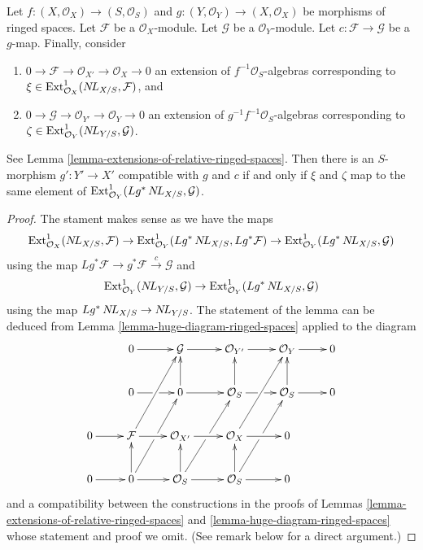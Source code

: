 \begin{lemma}
\label{lemma-extensions-of-relative-ringed-spaces-functorial}
Let $f : (X, \mathcal{O}_X) \to (S, \mathcal{O}_S)$ and
$g : (Y, \mathcal{O}_Y) \to (X, \mathcal{O}_X)$ be morphisms
of ringed spaces. Let $\mathcal{F}$ be a $\mathcal{O}_X$-module.
Let $\mathcal{G}$ be a $\mathcal{O}_Y$-module. Let
$c : \mathcal{F} \to \mathcal{G}$ be a $g$-map. Finally, consider
\begin{enumerate}
\item[(a)] $0 \to \mathcal{F} \to \mathcal{O}_{X'} \to \mathcal{O}_X \to 0$
an extension of $f^{-1}\mathcal{O}_S$-algebras
corresponding to $\xi \in \mathop{\mathrm{Ext}}\nolimits^1_{\mathcal{O}_X}(\mathop{N\!L}\nolimits_{X/S}, \mathcal{F})$, and
\item[(b)] $0 \to \mathcal{G} \to \mathcal{O}_{Y'} \to \mathcal{O}_Y \to 0$
an extension of $g^{-1}f^{-1}\mathcal{O}_S$-algebras
corresponding to $\zeta \in \mathop{\mathrm{Ext}}\nolimits^1_{\mathcal{O}_Y}(\mathop{N\!L}\nolimits_{Y/S}, \mathcal{G})$.
\end{enumerate}
See Lemma \ref{lemma-extensions-of-relative-ringed-spaces}.
Then there is an $S$-morphism $g' : Y' \to X'$
compatible with $g$ and $c$ if and only if $\xi$ and $\zeta$
map to the same element of
$\mathop{\mathrm{Ext}}\nolimits^1_{\mathcal{O}_Y}(Lg^*\mathop{N\!L}\nolimits_{X/S}, \mathcal{G})$.
\end{lemma}

\begin{proof}
The stament makes sense as we have the maps
$$
\mathop{\mathrm{Ext}}\nolimits^1_{\mathcal{O}_X}(\mathop{N\!L}\nolimits_{X/S}, \mathcal{F}) \to
\mathop{\mathrm{Ext}}\nolimits^1_{\mathcal{O}_Y}(Lg^*\mathop{N\!L}\nolimits_{X/S}, Lg^*\mathcal{F}) \to
\mathop{\mathrm{Ext}}\nolimits^1_{\mathcal{O}_Y}(Lg^*\mathop{N\!L}\nolimits_{X/S}, \mathcal{G})
$$
using the map $Lg^*\mathcal{F} \to g^*\mathcal{F} \xrightarrow{c} \mathcal{G}$
and
$$
\mathop{\mathrm{Ext}}\nolimits^1_{\mathcal{O}_Y}(\mathop{N\!L}\nolimits_{Y/S}, \mathcal{G}) \to
\mathop{\mathrm{Ext}}\nolimits^1_{\mathcal{O}_Y}(Lg^*\mathop{N\!L}\nolimits_{X/S}, \mathcal{G})
$$
using the map $Lg^*\mathop{N\!L}\nolimits_{X/S} \to \mathop{N\!L}\nolimits_{Y/S}$.
The statement of the lemma can be deduced from
Lemma \ref{lemma-huge-diagram-ringed-spaces} applied to the diagram
$$
\xymatrix{
& 0 \ar[r] &
\mathcal{G} \ar[r] &
\mathcal{O}_{Y'} \ar[r] &
\mathcal{O}_Y \ar[r] & 0 \\
& 0 \ar[r]|\hole & 0 \ar[u] \ar[r] &
\mathcal{O}_S \ar[u] \ar[r]|\hole &
\mathcal{O}_S \ar[u] \ar[r] & 0 \\
0 \ar[r] &
\mathcal{F} \ar[ruu] \ar[r] &
\mathcal{O}_{X'} \ar[r] &
\mathcal{O}_X \ar[ruu] \ar[r] & 0 \\
0 \ar[r] & 0 \ar[ruu]|\hole \ar[u] \ar[r] &
\mathcal{O}_S \ar[ruu]|\hole \ar[u] \ar[r] &
\mathcal{O}_S \ar[ruu]|\hole \ar[u] \ar[r] & 0
}
$$
and a compatibility between the constructions in the proofs
of Lemmas \ref{lemma-extensions-of-relative-ringed-spaces} and
\ref{lemma-huge-diagram-ringed-spaces}
whose statement and proof we omit. (See remark below for a direct argument.)
\end{proof}

